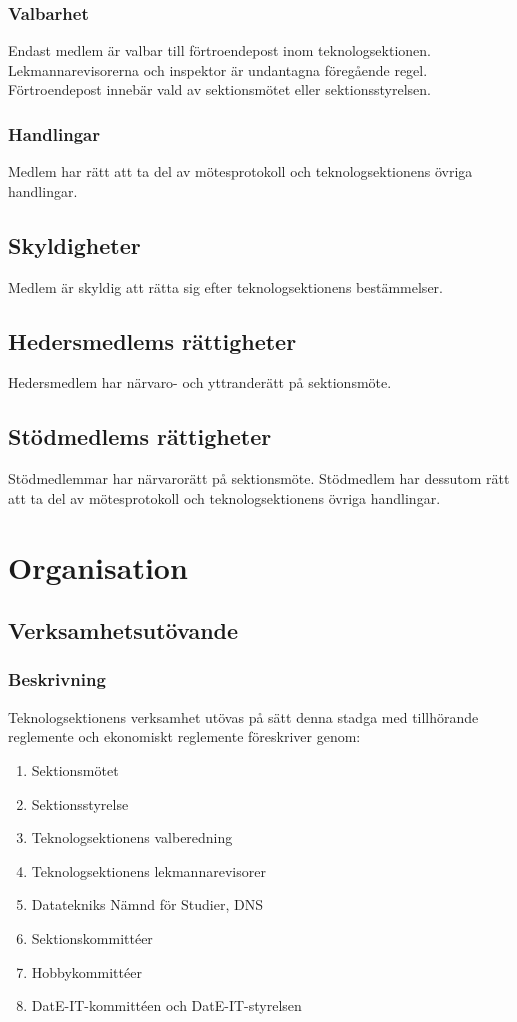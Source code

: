 \documentclass[a4paper]{dtek}
\begin{document}
\subsubsection{Valbarhet}
\label{sec:medlemmar_valbarhet}
Endast medlem är valbar till förtroendepost inom teknologsektionen. Lekmannarevisorerna och inspektor är undantagna föregående regel. Förtroendepost innebär vald av sektionsmötet eller sektionsstyrelsen.
\subsubsection{Handlingar}
Medlem har rätt att ta del av mötesprotokoll och teknologsektionens övriga handlingar.
\subsection{Skyldigheter}
Medlem är skyldig att rätta sig efter teknologsektionens bestämmelser.
\subsection{Hedersmedlems rättigheter}
Hedersmedlem har närvaro- och yttranderätt på sektionsmöte.
\subsection{Stödmedlems rättigheter}
Stödmedlemmar har närvarorätt på sektionsmöte. Stödmedlem har dessutom rätt att ta del av mötesprotokoll och teknologsektionens övriga handlingar.
\newpage

\section{Organisation}
\subsection{Verksamhetsutövande}
\subsubsection{Beskrivning}
Teknologsektionens verksamhet utövas på sätt denna stadga med tillhörande reglemente och ekonomiskt reglemente föreskriver genom:
\begin{enumerate}
\item Sektionsmötet
\item Sektionsstyrelse
\item Teknologsektionens valberedning
\item Teknologsektionens lekmannarevisorer
\item Datatekniks Nämnd för Studier, DNS
\item Sektionskommittéer
\item Hobbykommittéer
\item DatE-IT-kommittéen och DatE-IT-styrelsen
\end{enumerate}
\end{document}
